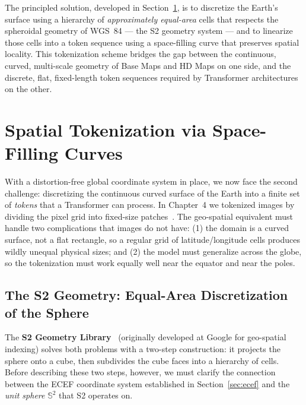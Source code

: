 \documentclass{book}
\begin{document}
The principled solution, developed in Section~\ref{sec:tokenization_spatial},
is to discretize the Earth's surface using a hierarchy of
\emph{approximately equal-area} cells that respects the spheroidal
geometry of WGS~84 --- the S2 geometry system --- and to linearize
those cells into a token sequence using a space-filling curve that
preserves spatial locality.  This tokenization scheme bridges the
gap between the continuous, curved, multi-scale geometry of Base Maps
and HD Maps on one side, and the discrete, flat, fixed-length token
sequences required by Transformer architectures on the other.

 


\section{Spatial Tokenization via Space-Filling Curves}
\label{sec:tokenization_spatial}
 
With a distortion-free global coordinate system in place, we now face
the second challenge: discretizing the continuous curved surface of
the Earth into a finite set of \emph{tokens} that a Transformer can
process.  In Chapter~4 we tokenized images by dividing the pixel grid
into fixed-size patches~\cite{dosovitskiy2021vit}.  The geo-spatial
equivalent must handle two complications that images do not have:
(1) the domain is a curved surface, not a flat rectangle, so a regular
grid of latitude/longitude cells produces wildly unequal physical
sizes; and (2) the model must generalize across the globe, so the
tokenization must work equally well near the equator and near the
poles.
 
\subsection{The S2 Geometry: Equal-Area Discretization of the Sphere}
\label{sec:s2}

The \textbf{S2 Geometry Library}~\cite{s2geometry} (originally
developed at Google for geo-spatial indexing) solves both problems
with a two-step construction: it projects the sphere onto a cube,
then subdivides the cube faces into a hierarchy of cells.  Before
describing these two steps, however, we must clarify the connection
between the ECEF coordinate system established in
Section~\ref{sec:ecef} and the \emph{unit sphere} $\mathbb{S}^2$ that
S2 operates on.
 
\end{document}
